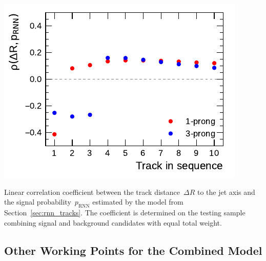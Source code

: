 \noindent
\begin{minipage}{\textwidth}
  \captionsetup{type=figure}
  \centering
  \includegraphics{./figures/rnn/track/dR_corr.pdf}
  \caption[Correlation of track $\Delta R$ and signal probability in the
  Track--RNN]{Linear correlation coefficient between the track
    distance~$\Delta R$ to the jet axis and the signal
    probability~$p_\text{RNN}$ estimated by the model from
    Section~\ref{sec:rnn_tracks}. The coefficient is determined on the testing
    sample combining signal and background candidates with equal total weight.}
\end{minipage}

\subsection{Other Working Points for the Combined Model}
\label{app:rnn_wp}

